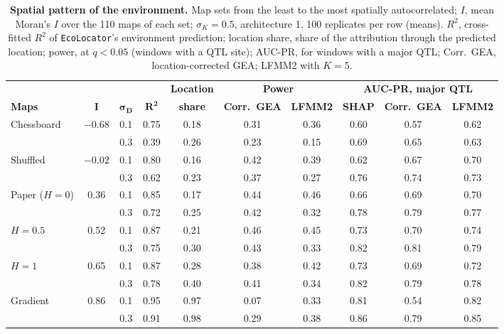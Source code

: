 \documentclass[]{article}
\newcommand{\ecolocator}{\texttt{EcoLocator}\xspace}
\begin{document}
\begin{table}[ht]
  \centering
  \caption{\textbf{Spatial pattern of the environment.}
  Map sets from the least to the most spatially autocorrelated;
  $I$, mean Moran's $I$ over the 110 maps of each set;
  $\sigma_K = 0.5$, architecture 1, 100 replicates per row (means).
  $R^2$, cross-fitted $R^2$ of \ecolocator's environment prediction;
  location share, share of the attribution
  through the predicted location;
  power, at $q < 0.05$ (windows with a QTL site);
  AUC-PR, for windows with a major QTL;
  Corr.\ GEA, location-corrected GEA;
  LFMM2 with $K = 5$.}
  \label{tab:spatial}
  \small
  \setlength{\tabcolsep}{3.5pt}
  \begin{tabular}{@{}lccccccccc@{}}
  \hline
  & & & & \textbf{Location} & \multicolumn{2}{c}{\textbf{Power}} & \multicolumn{3}{c}{\textbf{AUC-PR, major QTL}} \\
  \textbf{Maps} & $\boldsymbol{I}$ & $\boldsymbol{\sigma_D}$ & $\boldsymbol{R^2}$ & \textbf{share} & \textbf{Corr.\ GEA} & \textbf{LFMM2} & \textbf{SHAP} & \textbf{Corr.\ GEA} & \textbf{LFMM2} \\
  \hline
  Chessboard & $-0.68$ & 0.1 & 0.75 & 0.18 & 0.31 & 0.36 & 0.60 & 0.57 & 0.62 \\
   &  & 0.3 & 0.39 & 0.26 & 0.23 & 0.15 & 0.69 & 0.65 & 0.63 \\
  Shuffled & $-0.02$ & 0.1 & 0.80 & 0.16 & 0.42 & 0.39 & 0.62 & 0.67 & 0.70 \\
   &  & 0.3 & 0.62 & 0.23 & 0.37 & 0.27 & 0.76 & 0.74 & 0.73 \\
  Paper ($H = 0$) & 0.36 & 0.1 & 0.85 & 0.17 & 0.44 & 0.46 & 0.66 & 0.69 & 0.70 \\
   &  & 0.3 & 0.72 & 0.25 & 0.42 & 0.32 & 0.78 & 0.79 & 0.77 \\
  $H = 0.5$ & 0.52 & 0.1 & 0.87 & 0.21 & 0.46 & 0.45 & 0.73 & 0.70 & 0.74 \\
   &  & 0.3 & 0.75 & 0.30 & 0.43 & 0.33 & 0.82 & 0.81 & 0.79 \\
  $H = 1$ & 0.65 & 0.1 & 0.87 & 0.28 & 0.38 & 0.42 & 0.73 & 0.69 & 0.72 \\
   &  & 0.3 & 0.78 & 0.40 & 0.41 & 0.34 & 0.82 & 0.79 & 0.78 \\
  Gradient & 0.86 & 0.1 & 0.95 & 0.97 & 0.07 & 0.33 & 0.81 & 0.54 & 0.82 \\
   &  & 0.3 & 0.91 & 0.98 & 0.29 & 0.38 & 0.86 & 0.79 & 0.85 \\
  \hline
  \end{tabular}
\end{table}
\end{document}
